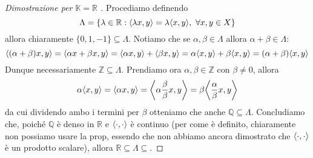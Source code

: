 \begin{proof}[Dimostrazione per \(\mathbb{K}=\mathbb{R}\) ]
    Procediamo definendo
    \[
      \Lambda = \{\lambda \in \mathbb{R} : {\left\langle\lambda x, y\right\rangle} = \lambda{\left\langle x,y\right\rangle} , \,\, \forall x,y \in X\} 
    \]
    allora chiaramente \(\{0, 1, -1\} \subseteq \Lambda\). Notiamo che se \(\alpha, \beta \in \Lambda\) allora \(\alpha + \beta \in \Lambda\):
    \[
      {\left\langle{(\alpha + \beta)}x, y\right\rangle} = {\left\langle\alpha x + \beta x, y\right\rangle} = {\left\langle\alpha x, y\right\rangle}  + {\left\langle\beta x, y\right\rangle} = \alpha {\left\langle x,y\right\rangle} + \beta {\left\langle x,y\right\rangle} = {(\alpha + \beta)}{\left\langle x,y\right\rangle} 
    \]
    Dunque necessariamente \(\mathbb{Z} \subseteq \Lambda \). Prendiamo ora \(\alpha, \beta \in \mathbb{Z}\) con \(\beta \neq 0\), allora
    \[
      \alpha{\left\langle x,y\right\rangle} = {\left\langle\alpha x, y\right\rangle} = {\left\langle\alpha \frac{\beta}{\beta}x,
      y \right\rangle} = \beta {\left\langle\frac{\alpha}{\beta}x, y\right\rangle} 
    \]
    da cui dividendo ambo i termini per \(\beta\) otteniamo che anche \(\mathbb{Q} \subseteq \Lambda \).
    Concludiamo che, poiché \(\mathbb{Q}\) è denso in \(\mathbb{R}\) e \({\left\langle\cdot ,\cdot \right\rangle} \) è continuo (per come è definito, chiaramente non possiamo usare la prop, essendo che non abbiamo ancora dimostrato che \({\left\langle\cdot ,\cdot \right\rangle} \) è  un prodotto scalare), allora \(\mathbb{R} \subseteq \Lambda \subseteq \).
\end{proof}
